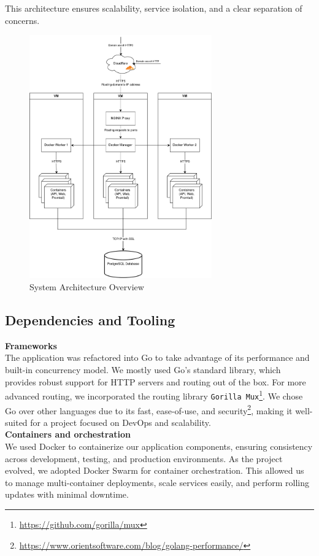 This architecture ensures scalability, service isolation, and a clear separation of concerns.
\begin{figure}[H]
  \centering
  \includegraphics[width=0.7\textwidth]{images/arch-overview.png}
  \caption{System Architecture Overview}
  \label{fig:arch-overview}
\end{figure}


\subsection{Dependencies and Tooling}
\textbf{Frameworks}
\\
The application was refactored into Go to take advantage of its performance and built-in concurrency model. We mostly used Go’s standard library, which provides robust support for HTTP servers and routing out of the box. For more advanced routing, we incorporated the routing library \texttt{Gorilla Mux}\footnote{\url{https://github.com/gorilla/mux}}. We chose Go over other languages due to its fast, ease-of-use, and security\footnote{\url{https://www.orientsoftware.com/blog/golang-performance/}}, making it well-suited for a project focused on DevOps and scalability.
\\

\noindent \textbf{Containers and orchestration}
\\
We used Docker to containerize our application components, ensuring consistency across development, testing, and production environments. As the project evolved, we adopted Docker Swarm for container orchestration. This allowed us to manage multi-container deployments, scale services easily, and perform rolling updates with minimal downtime.
\\

